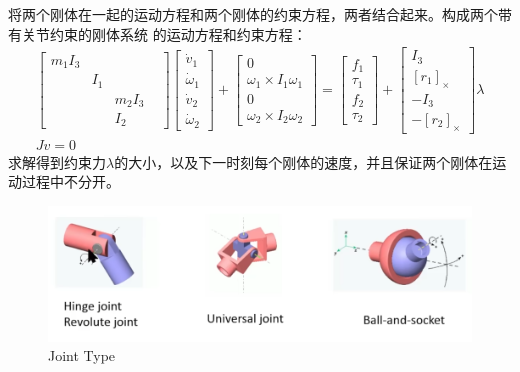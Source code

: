 \documentclass[lang=cn,newtx,10pt,scheme=chinese]{elegantbook}
\begin{document}
将两个刚体在一起的运动方程和两个刚体的约束方程，两者结合起来。构成两个带有关节约束的刚体系统
的运动方程和约束方程：
\begin{equation}
  \label{constrain::eqjoint}
  \begin{array}{r}
  {\left[\begin{array}{llll}
  m_1 I_3 & & & \\
  & I_1 & & \\
  & & m_2 I_3 & \\
  & & I_2
  \end{array}\right]\left[\begin{array}{l}
  \dot{v}_1 \\
  \dot{\omega}_1 \\
  \dot{v}_2 \\
  \dot{\omega}_2
  \end{array}\right]+\left[\begin{array}{c}
  0 \\
  \omega_1 \times I_1 \omega_1 \\
  0 \\
  \omega_2 \times I_2 \omega_2
  \end{array}\right]=\left[\begin{array}{c}
  f_1 \\
  \tau_1 \\
  f_2 \\
  \tau_2
  \end{array}\right]+\left[\begin{array}{c}
  I_3 \\
  {\left[r_1\right]_{\times}} \\
  -I_3 \\
  -\left[r_2\right]_{\times}
  \end{array}\right] \lambda} \\
  J v=0
  \end{array}
\end{equation}
求解得到约束力$\lambda$的大小，以及下一时刻每个刚体的速度，并且保证两个刚体在运动过程中不分开。

\begin{figure}[htbp]
  \centering
  \includegraphics[totalheight=1in]{"./image/JointType.png"}
  \caption{Joint Type} \label{fig:JointType}
\end{figure}
\end{document}
